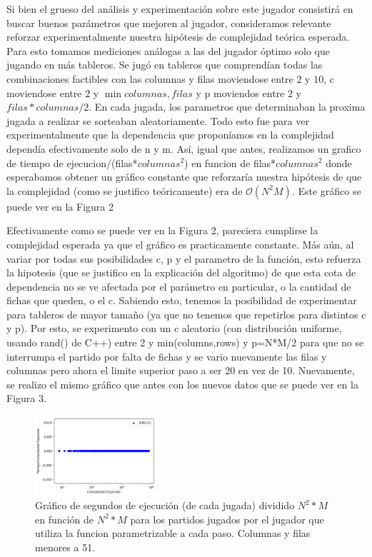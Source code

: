 \documentclass[A4paper,oneside,fleqn,11pt]{article}
\theoremstyle{definition}
\begin{document}
Si bien el grueso del análisis y experimentación sobre este jugador consistirá en buscar buenos parámetros que mejoren al jugador, consideramos relevante reforzar experimentalmente nuestra hipótesis de complejidad teórica esperada. Para esto tomamos mediciones análogas a las del jugador óptimo solo que jugando en más tableros. Se jugó en tableros que comprendían todas las combinaciones factibles con las columnas y filas moviendose entre $2$ y $10$, c moviendose entre $2$ y $\min{columnas,filas}$ y p moviendos entre $2$ y $filas*columnas/2$. En cada jugada, los parametros que determinaban la proxima jugada a realizar se sorteaban aleatoriamente. Todo esto fue para ver experimentalmente que la dependencia que proponíamos en la complejidad dependía efectivamente solo de n y m. Así, igual que antes, realizamos un grafico de tiempo de ejecucion/(filas*$columnas^2$) en funcion de filas*$columnas^2$ donde esperabamos obtener un gráfico constante que reforzaría nuestra hipótesis de que la complejidad (como se justifico teóricamente) era de $\mathcal{O}(N^2 M)$. Este gráfico se puede ver en la Figura 2




Efectivamente como se puede ver en la Figura 2, pareciera cumplirse la complejidad esperada ya que el gráfico es practicamente constante. Más aún,  al variar por todas sus posibilidades c, p y el parametro de la función, esto refuerza la hipotesis (que se justifico en la explicación del algoritmo) de que esta cota de dependencia no se ve afectada por el parámetro en particular, o la cantidad de fichas que queden, o el c. Sabiendo esto, tenemos la posibilidad de experimentar para tableros de mayor tamaño (ya que no tenemos que repetirlos para distintos c y p). Por esto, se experimento con un c aleatorio (con distribución uniforme, usando rand() de C++) entre 2 y min(columns,rows)  y p=N*M/2 para que no se interrumpa el partido por falta de fichas  y se vario nuevamente las filas y columnas pero ahora el limite superior paso a ser 20 en vez de 10. Nuevamente, se realizo el mismo gráfico que antes con los nuevos datos que se puede ver en la Figura 3.

\begin{figure}
	\includegraphics[width=0.4\textwidth]{complejidad2b.png}
	\caption{ Gráfico de segundos de ejecución (de cada jugada) dividido $N^2 *M$ en función de $N^2 * M$ para los partidos jugados por el jugador que utiliza la funcion parametrizable a cada paso. Columnas y filas menores a 51.}
\end{figure}
\end{document}
